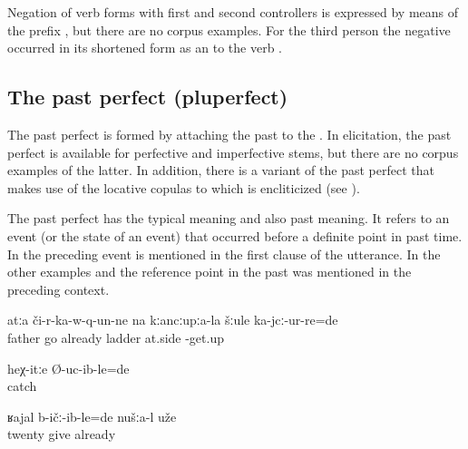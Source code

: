 Negation of verb forms with first and second  controllers is expressed by means of the prefix , but there are no corpus examples. For the third person the negative   occurred in its shortened form as an  to the verb . 



\subsection{The past perfect (pluperfect)}
\label{ssec:The past perfect (pluperfect)}

The past perfect is formed by attaching the past   to the . In elicitation, the past perfect is available for perfective and imperfective stems, but there are no corpus examples of the latter. In addition, there is a variant of the past perfect that makes use of the locative copulas to which  is encliticized (see ). 

The past perfect has the typical  meaning and also past  meaning. It refers to an event (or the  state of an event) that occurred before a definite point in past time. In  the preceding event is mentioned in the first clause of the utterance. In the other examples  and  the reference point in the past was mentioned in the preceding context.
%
\begin{exe}
	\ex	\label{ex:‎‎The father came down and stood next to the ladder analytic}
	\gll	atːa	či-r-ka-w-q-un-ne	na	kːancːupːa-la	šːule	ka-jcː-ur-re=de\\
		father	go	already	ladder	at.side	-get.up\\
	\glt	{}

	\ex	\label{ex:Like this (he) had caught (me) analytic}
	\gll	heχ-itːe	Ø-uc-ib-le=de\\
			catch\\
	\glt	{}

	\ex	\label{ex:‎‎‎We had already given twenty analytic}
	\gll	ʁajal	b-ičː-ib-le=de	nušːa-l	uže\\
		twenty	give		already\\
	\glt	{}
\end{exe}


